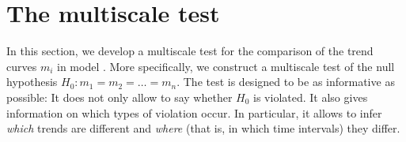 \documentclass[12pt]{article}
\makeatletter
\renewcommand{\eqref}[1]{\tagform@{\ref{#1}}}
\makeatother
\begin{document}



\section{The multiscale test}\label{sec:test}


In this section, we develop a multiscale test for the comparison of the trend curves $m_i$ in model \eqref{eq:model_full}. More specifically, we construct a multiscale test of the null hypothesis 
$H_0: m_1 = m_2 = \ldots = m_n$. 
The test is designed to be as informative as possible: It does not only allow to say whether $H_0$ is violated. It also gives information on which types of violation occur. In particular, it allows to infer \textit{which} trends are different and \textit{where} (that is, in which time intervals) they differ. 
\end{document}
